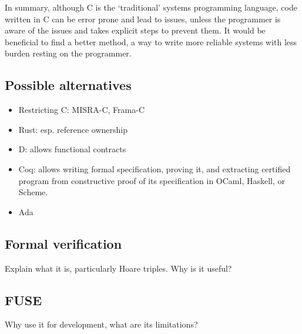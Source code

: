 In summary, although C is the `traditional' systems programming language, code written in C can be error prone and lead to issues, unless the programmer is aware of the issues and takes explicit steps to prevent them.
It would be beneficial to find a better method,  a way to write more reliable systems with less burden resting on the programmer.

\subsection{Possible alternatives}
\begin{itemize}
  \item Restricting C: MISRA-C, Frama-C
  \item Rust: esp. reference ownership
  \item D: allows functional contracts
  \item Coq: allows writing formal specification, proving it, and extracting certified program from constructive proof of its specification in OCaml, Haskell, or Scheme.
  \item Ada
\end{itemize}

\subsection{Formal verification}
Explain what it is, particularly Hoare triples.
Why is it useful?

\subsection{FUSE}
Why use it for development, what are its limitations?
